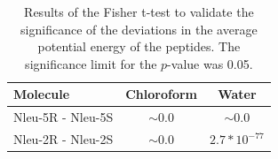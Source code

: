 \begin{table}[h!]
\centering
\caption{Results of the Fisher t-test to validate the significance of the deviations in the average potential energy of the peptides. The significance limit for the $p$-value was 0.05.}
\label{tab: SIstatTestingDiff}
\begin{adjustbox}{max width=\textwidth}
\begin{tabular}{lcc}
Molecule          & Chloroform & Water     \\
\hline
Nleu-5R - Nleu-5S & $\sim$0.0  & $\sim$0.0 \\
Nleu-2R - Nleu-2S & $\sim$0.0  & $2.7*10^{-77}$\\
\hline
\end{tabular}%
\end{adjustbox}
\end{table}

